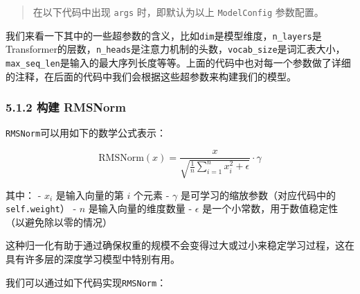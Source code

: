 \documentclass[12pt,a4paper]{book}
\begin{document}
\begin{Shaded}
\begin{Highlighting}[]
        \OperatorTok{=}
        \OperatorTok{=}
        \OperatorTok{=}
        \OperatorTok{=}
        \OperatorTok{=}
        \OperatorTok{=}
        \NormalTok{(}\OperatorTok{**}
\end{Highlighting}
\end{Shaded}

\begin{quote}
在以下代码中出现 \texttt{args} 时，即默认为以上 \texttt{ModelConfig}
参数配置。
\end{quote}

我们来看一下其中的一些超参数的含义，比如\texttt{dim}是模型维度，\texttt{n\_layers}是Transformer的层数，\texttt{n\_heads}是注意力机制的头数，\texttt{vocab\_size}是词汇表大小，\texttt{max\_seq\_len}是输入的最大序列长度等等。上面的代码中也对每一个参数做了详细的注释，在后面的代码中我们会根据这些超参数来构建我们的模型。

\subsubsection{5.1.2 构建 RMSNorm}\label{ux6784ux5efa-rmsnorm}

\texttt{RMSNorm}可以用如下的数学公式表示：

\[
\text{RMSNorm}(x) = \frac{x}{\sqrt{\frac{1}{n}\sum_{i=1}^{n}x_i^2 + \epsilon}} \cdot \gamma
\]

其中： - \(x_i\) 是输入向量的第 \(i\) 个元素 - \(\gamma\)
是可学习的缩放参数（对应代码中的 \texttt{self.weight}） - \(n\)
是输入向量的维度数量 - \(\epsilon\)
是一个小常数，用于数值稳定性（以避免除以零的情况）

这种归一化有助于通过确保权重的规模不会变得过大或过小来稳定学习过程，这在具有许多层的深度学习模型中特别有用。

我们可以通过如下代码实现\texttt{RMSNorm}：
\end{document}
